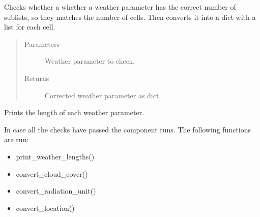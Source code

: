 \documentclass[letterpaper,10pt,english]{sphinxmanual}
\begin{document}
\begin{fulllineitems}

\begin{fulllineitems}
\label{\detokenize{cmf:livestock.components.comp_cmf.CMFWeather.match_cell_count}}
Checks whether a whether a weather parameter has the correct number of sublists,
so they matches the number of cells. Then converts it into a dict with a list for each cell.
\begin{quote}\begin{description}
\item[{Parameters}] \leavevmode
{} \textendash{} Weather parameter to check.

\item[{Returns}] \leavevmode
Corrected weather parameter as dict.

\end{description}\end{quote}

\end{fulllineitems}


\begin{fulllineitems}
\label{\detokenize{cmf:livestock.components.comp_cmf.CMFWeather.print_weather_lengths}}
Prints the length of each weather parameter.

\end{fulllineitems}


\begin{fulllineitems}
\label{\detokenize{cmf:livestock.components.comp_cmf.CMFWeather.run}}
In case all the checks have passed the component runs.
The following functions are run:
\begin{itemize}
\item {} 
print\_weather\_lengths()

\item {} 
convert\_cloud\_cover()

\item {} 
convert\_radiation\_unit()

\item {} 
convert\_location()


\end{itemize}
\end{fulllineitems}
\end{fulllineitems}
\end{document}
